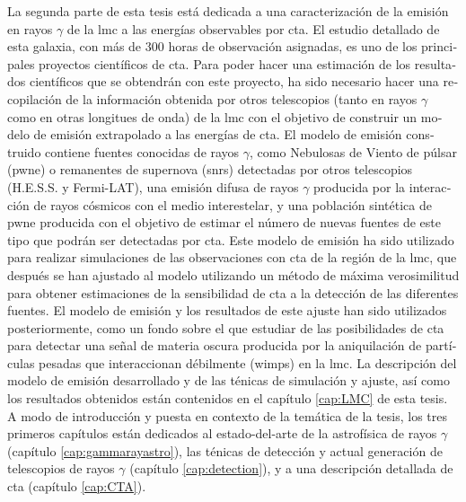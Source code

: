\documentclass[main.tex]{subfiles}
\begin{document}
\begin{otherlanguage}{spanish}
La segunda parte de esta tesis está dedicada a una caracterización de la emisión en rayos $\gamma$ de la \gls{lmc} a las energías observables por \gls{cta}. El estudio detallado de esta galaxia, con más de 300 horas de observación asignadas, es uno de los principales proyectos científicos de \gls{cta}. Para poder hacer una estimación de los resultados científicos que se obtendrán con este proyecto, ha sido necesario hacer una recopilación de la información obtenida por otros telescopios (tanto en rayos $\gamma$ como en otras longitues de onda) de la \gls{lmc} con el objetivo de construir un modelo de emisión extrapolado a las energías de \gls{cta}. El modelo de emisión construido contiene fuentes conocidas de rayos $\gamma$, como Nebulosas de Viento de púlsar (\gls{pwne}) o remanentes de supernova (\glspl{snr}) detectadas por otros telescopios (H.E.S.S. y Fermi-LAT), una emisión difusa de rayos $\gamma$ producida por la interacción de rayos cósmicos con el medio interestelar, y una población sintética de \gls{pwne} producida con el objetivo de estimar el número de nuevas fuentes de este tipo que podrán ser detectadas por \gls{cta}. Este modelo de emisión ha sido utilizado para realizar simulaciones de las observaciones con \gls{cta} de la región de la \gls{lmc}, que después se han ajustado al modelo utilizando un método de máxima verosimilitud para obtener estimaciones de la sensibilidad de \gls{cta} a la detección de las diferentes fuentes. El modelo de emisión y los resultados de este ajuste han sido utilizados posteriormente, como un fondo sobre el que estudiar de las posibilidades de \gls{cta} para detectar una señal de materia oscura producida por la aniquilación de partículas pesadas que interaccionan débilmente (\glspl{wimp}) en la \gls{lmc}. La descripción del modelo de emisión desarrollado y de las ténicas de simulación y ajuste, así como los resultados obtenidos están contenidos en el capítulo \ref{cap:LMC} de esta tesis. 
\\
A modo de introducción y puesta en contexto de la temática de la tesis, los tres primeros capítulos están dedicados al estado-del-arte de la astrofísica de rayos $\gamma$ (capítulo \ref{cap:gammarayastro}), las ténicas de detección y actual generación de telescopios de rayos $\gamma$ (capítulo \ref{cap:detection}), y a una descripción detallada de \gls{cta} (capítulo \ref{cap:CTA}). 
\end{otherlanguage}
\end{document}
